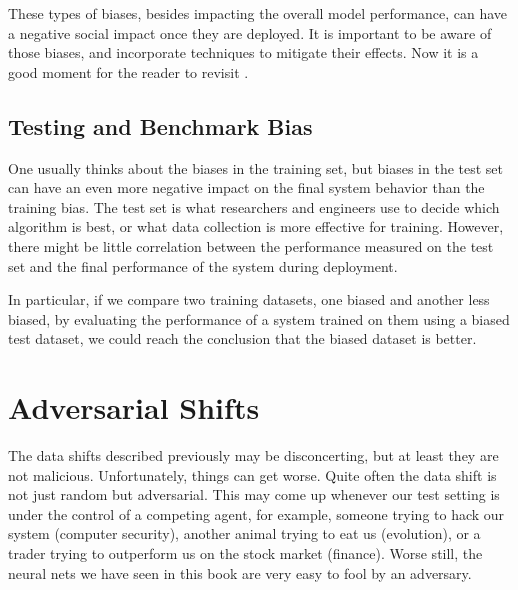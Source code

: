 These types of biases, besides impacting the overall model performance, can have a negative social impact once they are deployed. It is important to be aware of those biases, and incorporate techniques to mitigate their effects. Now it is a good moment for the reader to revisit \chap{\ref{chapter:computer_vision_and_society}}. 


\subsection{Testing and Benchmark Bias}

One usually thinks about the biases in the training set, but biases in the test set can have an even more negative impact on the final system behavior than the training bias. The test set is what researchers and engineers use to decide which algorithm is best, or what data collection is more effective for training. However, there might be little correlation between the performance measured on the test set and the final performance of the system during deployment.

In particular, if we compare two training datasets, one biased and another less biased, by evaluating the performance of a system trained on them using a biased test dataset, we could reach the conclusion that the biased dataset is better.


\section{Adversarial Shifts}

The data shifts described previously may be disconcerting, but at least they are not malicious. Unfortunately, things can get worse. Quite often the data shift is not just random but adversarial. This may come up whenever our test setting is under the control of a competing agent, for example, someone trying to hack our system (computer security), another animal trying to eat us (evolution), or a trader trying to outperform us on the stock market (finance). Worse still, the neural nets we have seen in this book are very easy to fool by an adversary. 

